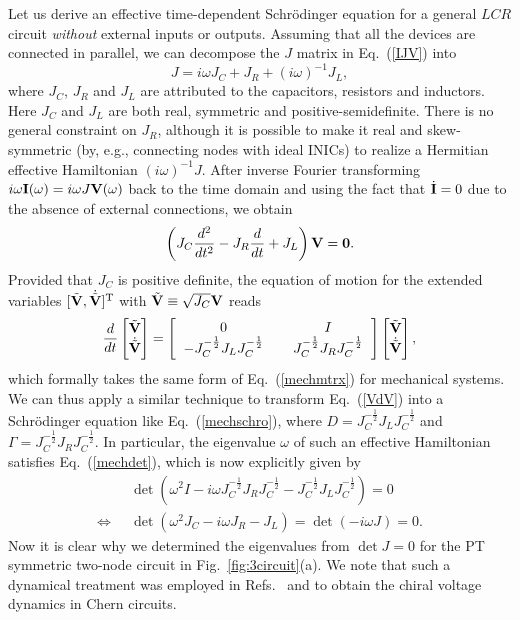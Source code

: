 \documentclass{tADP2e}
\theoremstyle{plain}
\theoremstyle{plain}
\theoremstyle{definition}
\begin{document}
Let us derive an effective time-dependent Schr\"odinger equation for a general $LCR$ circuit \emph{without} external inputs or outputs. Assuming that all the devices are connected in parallel, we can decompose  
the $J$ matrix in Eq.~(\ref{IJV}) into
\begin{equation}
J=i\omega J_C+J_R+(i\omega)^{-1} J_L,
\end{equation}
where $J_C$, $J_R$ and $J_L$ are attributed to the capacitors, resistors and inductors. Here $J_C$ and $J_L$ are both real, symmetric and positive-semidefinite. There is no general constraint on $J_R$, although it is possible to make it real and skew-symmetric (by, e.g., connecting nodes with ideal INICs) to realize a Hermitian effective Hamiltonian $(i\omega)^{-1}J$. 
After inverse Fourier transforming $i\omega\bold{I}(\omega)=i\omega J\bold{V}(\omega)$ back to the time domain and using the fact that $\dot{\bold{I}}=0$ due to the absence of external connections, we obtain
\begin{equation}
\left(J_C\frac{d^2}{dt^2}-J_R\frac{d}{dt}+J_L\right)\bold{V}=\bold{0}.
\end{equation} 
Provided that $J_C$ is positive definite, the equation of motion for the extended variables $[\tilde{\bold{V}},\dot{\tilde{\bold{V}}}]^{\rm T}$ with $\tilde{\bold{V}}\equiv\sqrt{J_C}\bold{V}$ reads
\begin{equation}
\frac{d}{dt}\begin{bmatrix} \tilde{\bold{V}} \\ \dot{\tilde{\bold{V}}} \end{bmatrix}=
\begin{bmatrix} 
\;\;0\;\; & \;\;I\;\; \\ 
\;\;-J_C^{-\frac{1}{2}}J_LJ_C^{-\frac{1}{2}}\;\; & \;\;J_C^{-\frac{1}{2}}J_RJ_C^{-\frac{1}{2}}\;\;
\end{bmatrix}
\begin{bmatrix} \tilde{\bold{V}} \\ \dot{\tilde{\bold{V}}} \end{bmatrix},
\label{VdV}
\end{equation}
which formally takes the same form of Eq.~(\ref{mechmtrx}) for mechanical systems. We can thus apply a similar technique to transform Eq.~(\ref{VdV}) into a Schr\"odinger equation like Eq.~(\ref{mechschro}), where $D=J_C^{-\frac{1}{2}}J_LJ_C^{-\frac{1}{2}}$ and $\Gamma=J_C^{-\frac{1}{2}}J_RJ_C^{-\frac{1}{2}}$. In particular, the eigenvalue $\omega$ of such an effective Hamiltonian satisfies Eq.~(\ref{mechdet}), which is now explicitly given by
\begin{equation}
\begin{split}
&\det(\omega^2I-i\omega J_C^{-\frac{1}{2}}J_RJ_C^{-\frac{1}{2}}-J_C^{-\frac{1}{2}}J_LJ_C^{-\frac{1}{2}})=0 \\
\Leftrightarrow\;\;&\det(\omega^2J_C-i\omega J_R-J_L)=\det(-i\omega J)=0.
\end{split}
\end{equation}
Now it is clear why we determined the eigenvalues from $\det J=0$ for the PT symmetric two-node circuit in Fig.~\ref{fig:3circuit}(a). We note that such a dynamical treatment was employed in Refs.~\cite{HR19} and \cite{HT19} to obtain the chiral voltage dynamics in Chern circuits.
\end{document}
